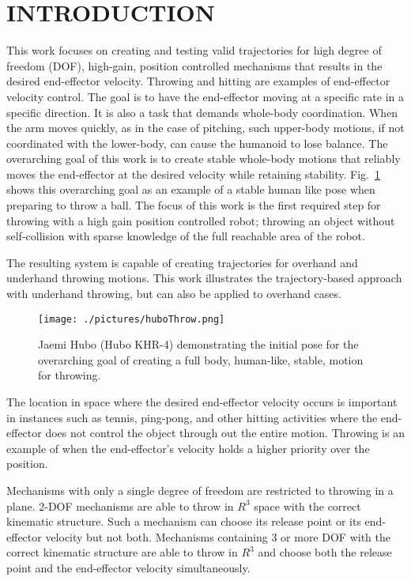 \section{INTRODUCTION}\label{sec:intro}

This work focuses on creating and testing valid trajectories for high degree of freedom (DOF), high-gain, position controlled mechanisms that results in the desired end-effector velocity.  Throwing and hitting are examples of end-effector velocity control.  The goal is to have the end-effector moving at a specific rate in a specific direction.  It is also a task that demands whole-body coordination.  When the arm moves quickly, as in the case of pitching, such upper-body motions, if not coordinated with the lower-body, can cause the humanoid to lose balance.  The overarching goal of this work is to create stable whole-body motions that reliably moves the end-effector at the desired velocity while retaining stability.  Fig.~\ref{fig:huboOneFoot} shows this overarching goal as an example of a stable human like pose when preparing to throw a ball.  The focus of this work is the first required step for throwing with a high gain position controlled robot; throwing an object without self-collision with sparse knowledge of the full reachable area of the robot.  

The resulting system is capable of creating trajectories for overhand and underhand throwing motions.  This work illustrates the trajectory-based approach with underhand throwing, but can also be applied to overhand cases.

\begin{figure}[t!]%
  \centering
\texttt{[image: ./pictures/huboThrow.png]}
  \caption{Jaemi Hubo (Hubo KHR-4) demonstrating the initial pose for the overarching goal of creating a full body, human-like, stable, motion for throwing.}
  \label{fig:huboOneFoot}
\end{figure}

The location in space where the desired end-effector velocity occurs is important in instances such as tennis, ping-pong, and other hitting activities where the end-effector does not control the object through out the entire motion.  Throwing is an example of when the end-effector's velocity holds a higher priority over the position.  


Mechanisms with only a single degree of freedom are restricted to throwing in a plane.   2-DOF mechanisms are able to throw in $R^3$ space with the correct kinematic structure.  Such a mechanism can choose its release point or its end-effector velocity but not both.  Mechanisms containing 3 or more DOF with the correct kinematic structure are able to throw in $R^3$ and choose both the release point and the end-effector velocity simultaneously.  

